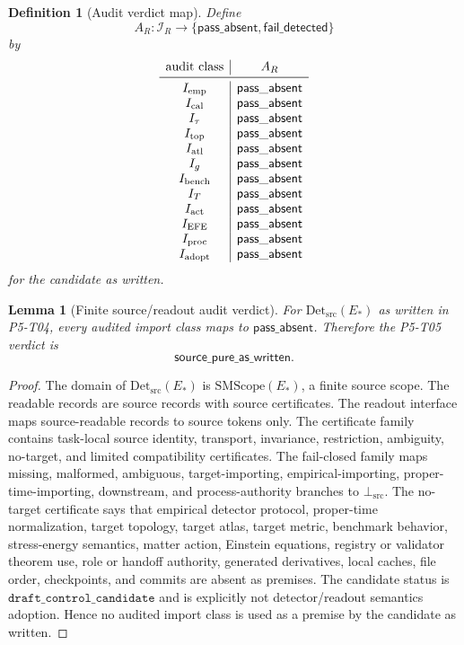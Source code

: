 \documentclass[11pt]{article}
\newcommand{\AuditVerdict}{\mathsf{source\_pure\_as\_written}}
\newcommand{\PassAbsent}{\mathsf{pass\_absent}}
\newcommand{\FailDetected}{\mathsf{fail\_detected}}
\newcommand{\EStar}{E_{\ast}}
\newcommand{\SMScope}{\mathrm{SMScope}}
\newcommand{\DetSrc}{\mathrm{Det}_{\mathrm{src}}}
\newcommand{\BottomSrc}{\bot_{\mathrm{src}}}
\newcommand{\AuditSet}{\mathcal{I}_{R}}
\newcommand{\AuditMap}{A_{R}}
\newtheorem{definition}{Definition}
\newtheorem{lemma}{Lemma}
\begin{document}
\begin{definition}[Audit verdict map]
Define
\[
  \AuditMap:\AuditSet\to\{\PassAbsent,\FailDetected\}
\]
by
\[
\begin{array}{c|c}
\text{audit class} & \AuditMap \\
\midrule
I_{\mathrm{emp}} & \PassAbsent\\
I_{\mathrm{cal}} & \PassAbsent\\
I_{\tau} & \PassAbsent\\
I_{\mathrm{top}} & \PassAbsent\\
I_{\mathrm{atl}} & \PassAbsent\\
I_{g} & \PassAbsent\\
I_{\mathrm{bench}} & \PassAbsent\\
I_T & \PassAbsent\\
I_{\mathrm{act}} & \PassAbsent\\
I_{\mathrm{EFE}} & \PassAbsent\\
I_{\mathrm{proc}} & \PassAbsent\\
I_{\mathrm{adopt}} & \PassAbsent
\end{array}
\]
for the candidate as written.
\end{definition}

\begin{lemma}[Finite source/readout audit verdict]
For \(\DetSrc(\EStar)\) as written in P5-T04, every audited import class maps
to \(\PassAbsent\). Therefore the P5-T05 verdict is
\[
  \AuditVerdict .
\]
\end{lemma}

\begin{proof}
The domain of \(\DetSrc(\EStar)\) is \(\SMScope(\EStar)\), a finite source
scope. The readable records are source records with source certificates. The
readout interface maps source-readable records to source tokens only. The
certificate family contains task-local source identity, transport,
invariance, restriction, ambiguity, no-target, and limited compatibility
certificates. The fail-closed family maps missing, malformed, ambiguous,
target-importing, empirical-importing, proper-time-importing, downstream, and
process-authority branches to \(\BottomSrc\). The no-target certificate says
that empirical detector protocol, proper-time normalization, target topology,
target atlas, target metric, benchmark behavior, stress-energy semantics,
matter action, Einstein equations, registry or validator theorem use, role or
handoff authority, generated derivatives, local caches, file order,
checkpoints, and commits are absent as premises. The candidate status is
\(\texttt{draft\_control\_candidate}\) and is explicitly not detector/readout
semantics adoption. Hence no audited import class is used as a premise by the
candidate as written.
\end{proof}
\end{document}
